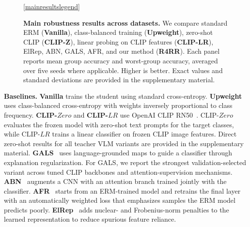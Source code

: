 \begin{figure}[h]

\vspace{-0.3em}
\ref{mainresultslegend}

\vspace{-0.5em}
\caption{
\textbf{Main robustness results across datasets.}
We compare standard ERM (\textbf{Vanilla}), class-balanced training (\textbf{Upweight}), zero-shot CLIP (\textbf{CLIP-Z}), linear probing on CLIP features (\textbf{CLIP-LR}), ElRep, ABN, GALS, AFR, and our method (\textbf{R4RR}).
Each panel reports mean group accuracy and worst-group accuracy, averaged over five seeds where applicable. Higher is better.
Exact values and standard deviations are provided in the supplementary material.
}
\label{fig:main_results}
\end{figure}





\textbf{Baselines.} \textbf{Vanilla} trains the student using standard cross-entropy. \textbf{Upweight}~\cite{petryk2022guiding} uses class-balanced cross-entropy with weights inversely proportional to class frequency. \textbf{CLIP-${Zero}$} and \textbf{CLIP-${LR}$} use OpenAI CLIP RN50~\cite{radford2021learning}. CLIP-${Zero}$ evaluates the frozen model with zero-shot text prompts for the target classes, while CLIP-${LR}$ trains a linear classifier on frozen CLIP image features. Direct zero-shot results for all teacher VLM variants are provided in the supplementary material. \textbf{GALS}~\cite{petryk2022guiding} uses language-grounded maps to guide a classifier through explanation regularization. For GALS, we report the strongest validation-selected variant across tuned CLIP backbones and attention-supervision mechanisms. \textbf{ABN}~\cite{fukui2019attention} augments a CNN with an attention branch trained jointly with the classifier. \textbf{AFR}~\cite{qiu2023simple} starts from an ERM-trained model and retrains the final layer with an automatically weighted loss that emphasizes samples the ERM model predicts poorly. \textbf{ElRep}~\cite{wen2025elastic} adds nuclear- and Frobenius-norm penalties to the learned representation to reduce spurious feature reliance.




